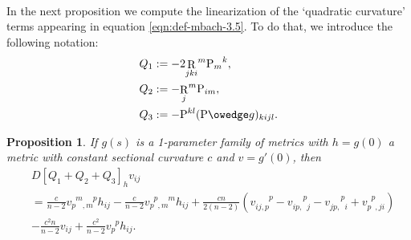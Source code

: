 \documentclass[10pt,reqno]{amsart}
\newtheorem{prop}[theorem]{Proposition}
\DeclareMathOperator{\Rc}{R}
\renewcommand{\P}{\mathrm{P}}
\DeclareMathOperator{\R}{R}
\newcommand{\vdu}[2]{v_{#1}^{\phantom{#1} #2}}
\newcommand{\vdddu}[4]{v_{#1 #2, #3}^{\phantom{#1#2,#3} #4}}
\newcommand{\vddud}[4]{v_{#1 #2, \phantom{#3} #4}^{\phantom{#1#2,} #3 \phantom{#4}}}
\newcommand{\vdudd}[4]{v_{#1 \phantom{#2}, #3 #4}^{\phantom{#1} #2 \phantom{, #3 #4}}}
\newcommand{\vdudu}[4]{v_{#1 \phantom{#2}, #3 \phantom{#4}}^{\phantom{#1} #2 \phantom{, #3} #4}}
\begin{document}
\ 

In the next proposition we compute the linearization of the `quadratic curvature' terms appearing in equation \eqref{eqn:def-mbach-3.5}.  To do that, we introduce the following notation:
\begin{align*}
Q_1 &:= - 2 {\R_{jki}}^m {\P_{m}}^k, \\
Q_2 &:= - {\Rc_{j}}^m \P_{im}, \\
Q_3 &:=  - \P^{kl} (\P \owedge g)_{kijl}.
\end{align*}
\begin{prop}
If $g(s)$ is a 1-parameter family of metrics with $h = g(0)$ a metric with constant sectional curvature $c$ and $v = g'(0)$, then  
 \begin{align*}
	&D[Q_1+Q_2+Q_3]_h v_{ij} \nonumber
	\\&= \frac{c}{n-2} \vdudu{p}{m}{m}{p} h_{ij} - \frac{c}{n-2} \vdudu{p}{p}{m}{m} h_{ij} + \frac{cn}{2(n-2)} (\vdddu{i}{j}{p}{p} - \vddud{i}{p}{p}{j} - \vddud{j}{p}{p}{i} + \vdudd{p}{p}{j}{i})\\
	& - \frac{c^2 n}{n-2} v_{ij} + \frac{c^2}{n-2} \vdu{p}{p} h_{ij}. \nonumber
	\end{align*}
\end{prop}
\end{document}
